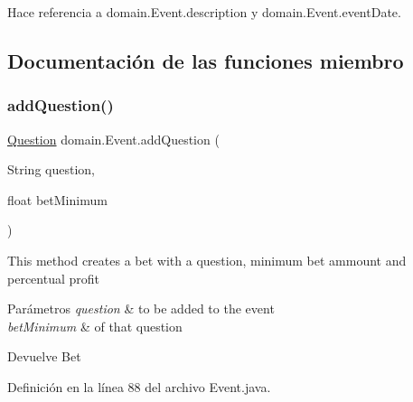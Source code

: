 Hace referencia a domain.\+Event.\+description y domain.\+Event.\+event\+Date.



\subsection{Documentación de las funciones miembro}
\mbox{\label{classdomain_1_1Event_a6e0414a3ec8ad5169aedd5dd068fc4cf}} 
\subsubsection{\texorpdfstring{addQuestion()}{addQuestion()}\hspace{0.1cm}{\footnotesize\ttfamily [1/2]}}
{\footnotesize\ttfamily \mbox{\hyperlink{classdomain_1_1Question}{Question}} domain.\+Event.\+add\+Question (\begin{DoxyParamCaption}\item[{String}]{question,  }\item[{float}]{bet\+Minimum }\end{DoxyParamCaption})}

This method creates a bet with a question, minimum bet ammount and percentual profit


\begin{DoxyParams}{Parámetros}
{\em question} & to be added to the event \\
\hline
{\em bet\+Minimum} & of that question \\
\hline
\end{DoxyParams}
\begin{DoxyReturn}{Devuelve}
Bet 
\end{DoxyReturn}


Definición en la línea 88 del archivo Event.\+java.


\begin{DoxyCode}{0}

\end{DoxyCode}


